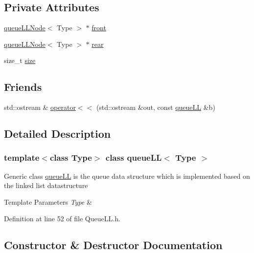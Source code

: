 \subsection*{Private Attributes}
\begin{DoxyCompactItemize}
\item 
\hyperlink{classqueue_l_l_node}{queue\+L\+L\+Node}$<$ Type $>$ $\ast$ \hyperlink{classqueue_l_l_a622ea439d113fe8e4616320ec2346d8b}{front}
\item 
\hyperlink{classqueue_l_l_node}{queue\+L\+L\+Node}$<$ Type $>$ $\ast$ \hyperlink{classqueue_l_l_aab0540567095f05fb1c981a2e7e4e93e}{rear}
\item 
size\+\_\+t \hyperlink{classqueue_l_l_af2ae538d6971624f1c8404d3a8502aa0}{size}
\end{DoxyCompactItemize}
\subsection*{Friends}
\begin{DoxyCompactItemize}
\item 
std\+::ostream \& \hyperlink{classqueue_l_l_a24d410ee760513f96b06f242b1025e8e}{operator$<$$<$} (std\+::ostream \&out, const \hyperlink{classqueue_l_l}{queue\+LL} \&b)
\end{DoxyCompactItemize}


\subsection{Detailed Description}
\subsubsection*{template$<$class Type$>$\newline
class queue\+L\+L$<$ Type $>$}

Generic class \hyperlink{classqueue_l_l}{queue\+LL} is the queue data structure which is implemented based on the linked list datastructure 
\begin{DoxyTemplParams}{Template Parameters}
{\em Type} & \\
\hline
\end{DoxyTemplParams}


Definition at line 52 of file Queue\+L\+L.\+h.



\subsection{Constructor \& Destructor Documentation}
\mbox{\label{classqueue_l_l_a8d7c7b45de1dcf799d5c7bad996094eb}} 
